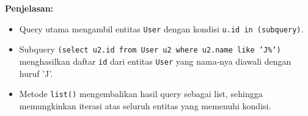 \textbf{Penjelasan:}
\begin{itemize}
	\item Query utama mengambil entitas \texttt{User} dengan kondisi \texttt{u.id in (subquery)}.
	\item Subquery \texttt{(select u2.id from User u2 where u2.name like 'J\%')} menghasilkan daftar \texttt{id} dari entitas \texttt{User} yang nama-nya diawali dengan huruf 'J'.
	\item Metode \texttt{list()} mengembalikan hasil query sebagai list, sehingga memungkinkan iterasi atas seluruh entitas yang memenuhi kondisi.
\end{itemize}


